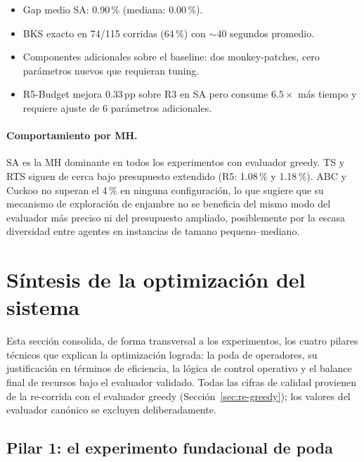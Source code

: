 \begin{itemize}
\item Gap medio SA: 0.90\,\% (mediana: 0.00\,\%).
\item BKS exacto en 74/115 corridas (64\,\%) con $\sim 40$ segundos promedio.
\item Componentes adicionales sobre el baseline: dos monkey-patches,
      cero parámetros nuevos que requieran tuning.
\item R5-Budget mejora 0.33\,pp sobre R3 en SA pero consume $6.5\times$
      más tiempo y requiere ajuste de 6 parámetros adicionales.
\end{itemize}

\paragraph{Comportamiento por MH.}
SA es la MH dominante en todos los experimentos con evaluador greedy.
TS y RTS siguen de cerca bajo presupuesto extendido (R5: 1.08\,\% y
1.18\,\%). ABC y Cuckoo no superan el 4\,\% en ninguna configuración,
lo que sugiere que su mecanismo de exploración de enjambre no se
beneficia del mismo modo del evaluador más preciso ni del presupuesto
ampliado, posiblemente por la escasa diversidad entre agentes en
instancias de tamano pequeno--mediano.

\section{Síntesis de la optimización del sistema}
\label{sec:sintesis-optimizacion}

Esta sección consolida, de forma transversal a los experimentos, los
cuatro pilares técnicos que explican la optimización lograda: la poda de
operadores, su justificación en términos de eficiencia, la lógica de
control operativo y el balance final de recursos bajo el evaluador
validado. Todas las cifras de calidad provienen de la re-corrida con el
evaluador greedy (Sección~\ref{sec:re-greedy}); los valores del evaluador
canónico se excluyen deliberadamente.

\subsection{Pilar 1: el experimento fundacional de poda}
\label{subsec:pilar-poda}

